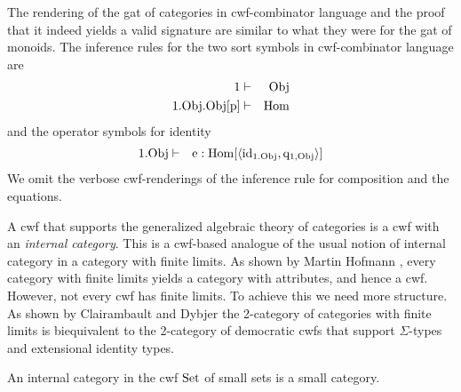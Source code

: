 \documentclass{lmcs}
\def\Obj{\mathrm{Obj}}
\def\Hom{\mathrm{Hom}}
\def\id{\mathrm{id}}
\def\idmon{\mathrm{e}}
\begin{document}
The rendering of the gat of categories in cwf-combinator language and the proof that it indeed yields a valid signature are similar to what they were for the gat of monoids. The inference rules for the two sort symbols in cwf-combinator language are
\begin{eqnarray*}
1 &\vdash& \Obj\\
1.\Obj.\Obj[\p] &\vdash& \Hom
\end{eqnarray*}
and the operator symbols for identity
\begin{eqnarray*}
1.\Obj &\vdash& \idmon : \Hom[\tuple{\id_{1.\Obj},\q_{1,\Obj}}]
\end{eqnarray*}
We omit the verbose cwf-renderings of the inference rule for composition and the equations.

A cwf that supports the generalized algebraic theory of categories is a cwf with an {\em internal category}. This is a cwf-based analogue of the usual notion of internal category in a category with finite limits. As shown by Martin Hofmann \cite{hofmann:csl,hofmann:cambridge}, every category with finite limits yields a category with attributes, and hence a cwf. However, not every cwf has finite limits. To achieve this we need more structure. As shown by Clairambault and Dybjer \cite{ClairambaultD11,ClairambaultD14} the 2-category of categories with finite limits is biequivalent to the 2-category of democratic cwfs that support $\Sigma$-types and extensional identity types.

An internal category in the cwf ${\rm Set}$ of small sets is a small category.
\end{document}

